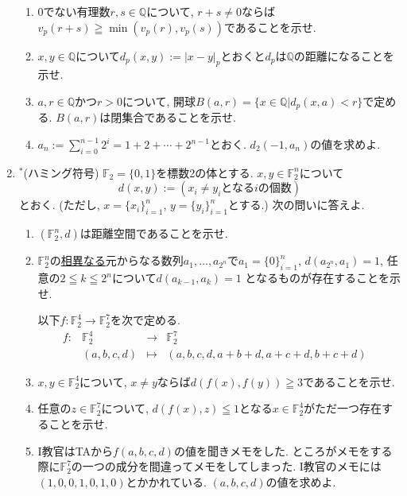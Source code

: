 \documentclass[dvipdfmx,a4paper,11pt]{article}
\newcommand{\Q}{\mathbb{Q}}
\theoremstyle{definition}
\begin{document}
\begin{enumerate}[label=\textbf{問}\ref*{sec-euc}.\arabic*]
\begin{enumerate}
\setlength{\parskip}{0cm}
  \setlength{\itemsep}{0pt} 
\item 0でない有理数$r,s \in \Q$について, $r+s \neq 0$ならば$v_{p}(r+s) \geqq \min(v_{p}(r), v_{p}(s))$であることを示せ.
\item $x,y \in \Q$について$d_{p}(x,y) :=|x-y|_{p} $とおくと$d_{p}$は$\Q$の距離になることを示せ.
\item $a,r \in \Q$かつ$r>0$について, 開球$B(a,r)=\{x \in \Q | d_{p}(x,a) < r \}$で定める. $B(a,r)$は閉集合であることを示せ.
\item $a_n := \sum_{i=0}^{n-1}2^i =1 + 2 + \cdots + 2^{n-1}$とおく. $d_{2}(-1, a_{n})$の値を求めよ. 
\end{enumerate}

\item $^{*}$(ハミング符号)
$\mathbb{F}_{2}=\{0,1\}$を標数2の体とする. 
$x,y \in \mathbb{F}_{2}^{n}$について
$$
d(x,y):= (\text{$x_i \neq y_i$となる$i$の個数})
$$
とおく. (ただし, $x=\{ x_i\}_{i=1}^{n}$, $y=\{ y_i\}_{i=1}^{n}$とする.) 次の問いに答えよ.
\begin{enumerate}
\setlength{\parskip}{0cm}
  \setlength{\itemsep}{0pt} 
\item $(\mathbb{F}_{2}^{n}, d)$は距離空間であることを示せ.
\item $\mathbb{F}_{2}^{n}$の\underline{相異なる}元からなる数列$a_{1}, \ldots, a_{2^n }$で$a_1=\{ 0\}_{i=1}^{n}$, $d(a_{2^n }, a_{1})=1$, 任意の$2 \leqq k \leqq 2^{n}$について$d(a_{k-1},a_{k})=1$
 となるものが存在することを示せ.
 
 \hspace{-22pt}以下$f : \mathbb{F}_{2}^{4} \to \mathbb{F}_{2}^{7}$を次で定める.
$$
\begin{array}{ccccc}
f: &\mathbb{F}_{2}^{4}& \rightarrow & \mathbb{F}_{2}^{7}& \\
&(a,b,c,d) & \longmapsto & 
(a,b,c,d,a+b+d, a+c+d, b+c+d)&
\end{array}
$$


\item $x, y \in \mathbb{F}_{2}^{4}$について, $x\neq y$ならば$d(f(x), f(y)) \geqq 3$であることを示せ.
\item 任意の$z \in \mathbb{F}_{2}^{7}$について, $d(f(x), z) \leqq 1$となる$x \in \mathbb{F}_{2}^{4} $がただ一つ存在することを示せ.
\item I教官はTAから$f(a,b,c,d)$の値を聞きメモをした. ところがメモをする際に$\mathbb{F}_{2}^{7}$の一つの成分を間違ってメモをしてしまった.  I教官のメモには$(1,0,0,1,0,1,0)$とかかれている. $(a,b,c,d)$の値を求めよ. 
  \end{enumerate}
  \end{enumerate}
\end{document}
